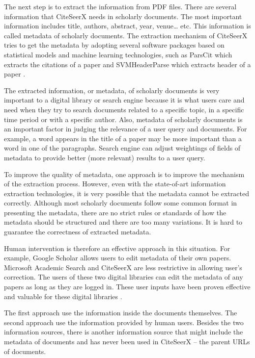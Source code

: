 \documentclass[prodmode]{acmsmall} %
\begin{document}
The next step is to extract the information from PDF files. There are several information that CiteSeerX needs in scholarly documents. The most important information includes title, authors, abstract, year, venue… etc. This information is called metadata of scholarly documents. The extraction mechanism of CiteSeerX tries to get the metadata by adopting several software packages based on statistical models and machine learning technologies, such as ParsCit \cite{councill2008parscit} which extracts the citations of a paper and SVMHeaderParse \cite{han2003automatic} which extracts header of a paper \cite{wu2014citeseerx}.

The extracted information, or metadata, of scholarly documents is very important to a digital library or search engine because it is what users care and need when they try to search documents related to a specific topic, in a specific time period or with a specific author. Also, metadata of scholarly documents is an important factor in judging the relevance of a user query and documents. For example, a word appears in the title of a paper may be more important than a word in one of the paragraphs. Search engine can adjust weightings of fields of metadata to provide better (more relevant) results to a user query.

To improve the quality of metadata, one approach is to improve the mechanism of the extraction process. However, even with the state-of-art information extraction technologies, it is very possible that the metadata cannot be extracted correctly. Although most scholarly documents follow some common format in presenting the metadata, there are no strict rules or standards of how the metadata should be structured and there are too many variations. It is hard to guarantee the correctness of extracted metadata.

Human intervention is therefore an effective approach in this situation. For example, Google Scholar allows users to edit metadata of their own papers. Microsoft Academic Search and CiteSeerX are less restrictive in allowing user’s correction. The users of these two digital libraries can edit the metadata of any papers as long as they are logged in. These user inputs have been proven effective and valuable for these digital libraries \cite{wu2014impact}.

The first approach use the information inside the documents themselves. The second approach use the information provided by human users. Besides the two information sources, there is another information source that might include the metadata of documents and has never been used in CiteSeerX -- the parent URLs of documents.
\end{document}
